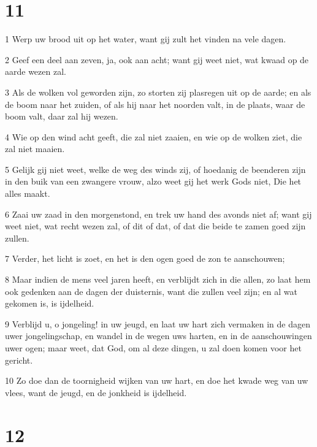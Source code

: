 \chapter{11}

\par 1 Werp uw brood uit op het water, want gij zult het vinden na vele dagen.
\par 2 Geef een deel aan zeven, ja, ook aan acht; want gij weet niet, wat kwaad op de aarde wezen zal.
\par 3 Als de wolken vol geworden zijn, zo storten zij plasregen uit op de aarde; en als de boom naar het zuiden, of als hij naar het noorden valt, in de plaats, waar de boom valt, daar zal hij wezen.
\par 4 Wie op den wind acht geeft, die zal niet zaaien, en wie op de wolken ziet, die zal niet maaien.
\par 5 Gelijk gij niet weet, welke de weg des winds zij, of hoedanig de beenderen zijn in den buik van een zwangere vrouw, alzo weet gij het werk Gods niet, Die het alles maakt.
\par 6 Zaai uw zaad in den morgenstond, en trek uw hand des avonds niet af; want gij weet niet, wat recht wezen zal, of dit of dat, of dat die beide te zamen goed zijn zullen.
\par 7 Verder, het licht is zoet, en het is den ogen goed de zon te aanschouwen;
\par 8 Maar indien de mens veel jaren heeft, en verblijdt zich in die allen, zo laat hem ook gedenken aan de dagen der duisternis, want die zullen veel zijn; en al wat gekomen is, is ijdelheid.
\par 9 Verblijd u, o jongeling! in uw jeugd, en laat uw hart zich vermaken in de dagen uwer jongelingschap, en wandel in de wegen uws harten, en in de aanschouwingen uwer ogen; maar weet, dat God, om al deze dingen, u zal doen komen voor het gericht.
\par 10 Zo doe dan de toornigheid wijken van uw hart, en doe het kwade weg van uw vlees, want de jeugd, en de jonkheid is ijdelheid.

\chapter{12}

